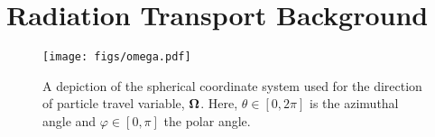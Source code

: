 \documentclass[../doc.tex]{subfiles}
\begin{document}
\chapter{Radiation Transport Background}



\begin{figure}
\centering
\texttt{[image: figs/omega.pdf]}
\caption{A depiction of the spherical coordinate system used for the direction of particle travel variable, $\boldsymbol{\Omega}$. Here, $\theta \in [0,2\pi]$ is the azimuthal angle and $\varphi \in [0,\pi]$ the polar angle. }
\label{vef:omega_diagram}
\end{figure}
\end{document}
